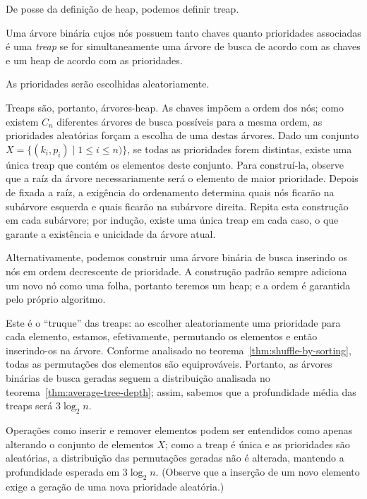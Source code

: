 De posse da definição de heap,
podemos definir treap.

\begin{definition}
    Uma árvore binária cujos nós possuem tanto chaves quanto prioridades associadas
    é uma \emph{treap}
    se for simultaneamente uma árvore de busca de acordo com as chaves
    e um heap de acordo com as prioridades.
\end{definition}

As prioridades serão escolhidas aleatoriamente.

Treaps são, portanto, árvores-heap.
As chaves impõem a ordem dos nós;
como existem $C_n$ diferentes árvores de busca possíveis para a mesma ordem,
as prioridades aleatórias forçam a escolha de uma destas árvores.
Dado um conjunto $X = \{ (k_i, p_i) \mid 1 \leq i \leq n) \}$,
se todas as prioridades forem distintas,
existe uma única treap que contém os elementos deste conjunto.
Para construí-la,
observe que a raíz da árvore necessariamente será o elemento de maior prioridade.
Depois de fixada a raíz,
a exigência do ordenamento determina quais nós ficarão na subárvore esquerda
e quais ficarão na subárvore direita.
Repita esta construção em cada subárvore;
por indução, existe uma única treap em cada caso,
o que garante a existência e unicidade da árvore atual.

Alternativamente,
podemos construir uma árvore binária de busca
inserindo os nós em ordem decrescente de prioridade.
A construção padrão sempre adiciona um novo nó como uma folha,
portanto teremos um heap;
e a ordem é garantida pelo próprio algoritmo.

Este é o ``truque'' das treaps:
ao escolher aleatoriamente uma prioridade para cada elemento,
estamos, efetivamente,
permutando os elementos e então inserindo-os na árvore.
Conforme analisado no teorema~\ref{thm:shuffle-by-sorting},
todas as permutações dos elementos são equiprováveis.
Portanto,
as árvores binárias de busca geradas
seguem a distribuição analisada no teorema~\ref{thm:average-tree-depth};
assim,
sabemos que a profundidade média das treaps será $3 \log_2 n$.

Operações como inserir e remover elementos
podem ser entendidos como apenas alterando o conjunto de elementos $X$;
como a treap é única e as prioridades são aleatórias,
a distribuição das permutações geradas não é alterada,
mantendo a profundidade esperada em $3 \log_2 n$.
(Observe que a inserção de um novo elemento
exige a geração de uma nova prioridade aleatória.)
